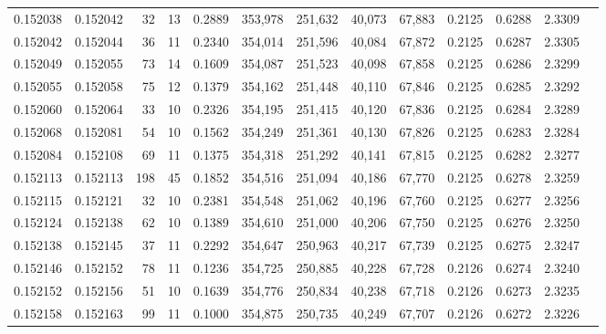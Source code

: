 \begin{tabular}{rrrrrrrrrrrrr}
0.152038 & 0.152042 &    32 &  13 &                                     0.2889 & 353,978 & 251,632 &  40,073 &  67,883 & 0.2125 & 0.6288 & 2.3309 \\
0.152042 & 0.152044 &    36 &  11 &                                     0.2340 & 354,014 & 251,596 &  40,084 &  67,872 & 0.2125 & 0.6287 & 2.3305 \\
0.152049 & 0.152055 &    73 &  14 &                                     0.1609 & 354,087 & 251,523 &  40,098 &  67,858 & 0.2125 & 0.6286 & 2.3299 \\
0.152055 & 0.152058 &    75 &  12 &                                     0.1379 & 354,162 & 251,448 &  40,110 &  67,846 & 0.2125 & 0.6285 & 2.3292 \\
0.152060 & 0.152064 &    33 &  10 &                                     0.2326 & 354,195 & 251,415 &  40,120 &  67,836 & 0.2125 & 0.6284 & 2.3289 \\
0.152068 & 0.152081 &    54 &  10 &                                     0.1562 & 354,249 & 251,361 &  40,130 &  67,826 & 0.2125 & 0.6283 & 2.3284 \\
0.152084 & 0.152108 &    69 &  11 &                                     0.1375 & 354,318 & 251,292 &  40,141 &  67,815 & 0.2125 & 0.6282 & 2.3277 \\
0.152113 & 0.152113 &   198 &  45 &                                     0.1852 & 354,516 & 251,094 &  40,186 &  67,770 & 0.2125 & 0.6278 & 2.3259 \\
0.152115 & 0.152121 &    32 &  10 &                                     0.2381 & 354,548 & 251,062 &  40,196 &  67,760 & 0.2125 & 0.6277 & 2.3256 \\
0.152124 & 0.152138 &    62 &  10 &                                     0.1389 & 354,610 & 251,000 &  40,206 &  67,750 & 0.2125 & 0.6276 & 2.3250 \\
0.152138 & 0.152145 &    37 &  11 &                                     0.2292 & 354,647 & 250,963 &  40,217 &  67,739 & 0.2125 & 0.6275 & 2.3247 \\
0.152146 & 0.152152 &    78 &  11 &                                     0.1236 & 354,725 & 250,885 &  40,228 &  67,728 & 0.2126 & 0.6274 & 2.3240 \\
0.152152 & 0.152156 &    51 &  10 &                                     0.1639 & 354,776 & 250,834 &  40,238 &  67,718 & 0.2126 & 0.6273 & 2.3235 \\
0.152158 & 0.152163 &    99 &  11 &                                     0.1000 & 354,875 & 250,735 &  40,249 &  67,707 & 0.2126 & 0.6272 & 2.3226 \\

\end{tabular}
